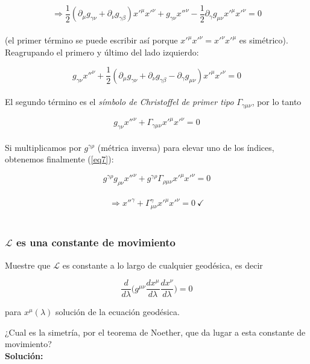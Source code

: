 $$\Rightarrow  \frac{1}{2}(\partial_{\mu} g_{\gamma \nu} + \partial_{\nu} g_{\gamma \beta})x'^{\mu}x'^{\nu} + g_{\gamma \nu}x''^{\nu} - \frac{1}{2}\partial_{\gamma}g_{\mu \nu}x'^{\mu}x'^{\nu} = 0$$\\

(el primer t\'ermino se puede escribir as\'i porque $x'^{\mu}x'^{\nu} = x'^{\nu}x'^{\mu}$ es sim\'etrico). Reagrupando el primero y \'ultimo del lado izquierdo:

$$g_{\gamma \nu}x''^{\nu} + \frac{1}{2}(\partial_{\mu} g_{\gamma \nu} + \partial_{\nu} g_{\gamma \beta} - \partial_{\gamma}g_{\mu \nu})x'^{\mu}x'^{\nu} = 0$$\\

El segundo t\'ermino es el \textit{s\'imbolo de Christoffel de primer tipo} $\Gamma_{\gamma \mu \nu}$, por lo tanto

$$g_{\gamma \nu}x''^{\nu} + \Gamma_{\gamma \mu \nu}x'^{\mu}x'^{\nu} = 0$$\\

Si multiplicamos por $g^{\gamma \rho}$ (m\'etrica inversa) para elevar uno de los \'indices, obtenemos finalmente (\ref{eq7}):

$$g^{\gamma \rho}g_{\rho \nu}x''^{\nu} + g^{\gamma \rho}\Gamma_{\rho \mu \nu}x'^{\mu}x'^{\nu} = 0$$\\

$$\Rightarrow x''^{\gamma} + \Gamma^{\gamma}_{\mu \nu}x'^{\mu}x'^{\nu} = 0 \ \checkmark$$\\

\subsubsection{$\mathcal{L}$ es una constante de movimiento}

Muestre que $\mathcal{L}$ es constante a lo largo de cualquier geod\'esica, es decir

\begin{equation}
    \frac{d}{d\lambda}\bigg( g^{\mu \nu}\frac{dx^{\mu}}{d\lambda}\frac{dx^{\nu}}{d\lambda} \bigg) = 0
    \label{eq9}
\end{equation}

para $x^{\mu}(\lambda)$ soluci\'on de la ecuaci\'on geod\'esica.

¿Cual es la simetr\'ia, por el teorema de Noether, que da lugar a esta constante de movimiento?\\

\textbf{Soluci\'on:}\\

